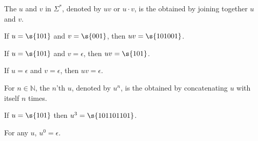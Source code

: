 \begin{flex}
\begin{definition} \label{definition:Concatenation-of-strings}
The  $u$ and $v$ in $\Sigma^*$, denoted by $uv$ or $u \cdot v$, is the  obtained by joining together $u$ and $v$. 
\end{definition}

\begin{example} \label{example:Concatenation-of-101-and-001}
If $u = \s{101}$ and $v = \s{001}$, then $uv = \s{101001}$.
\end{example}

\begin{example} \label{example:Concatenation-of-101-and-epsilon}
If $u = \s{101}$ and $v = \epsilon$, then $uv = \s{101}$.
\end{example}

\begin{example} \label{example:Concatenation-of-epsilon-and-epsilon}
If $u = \epsilon$ and $v = \epsilon$, then $uv = \epsilon$.
\end{example}
\end{flex}


\begin{flex}
\begin{definition} \label{definition:Powers-of-a-string}
For $n \in \mathbb{N}$, the $n$'th  $u$, denoted by $u^n$, is the  obtained by concatenating $u$ with itself $n$ times.
\end{definition}

\begin{example} \label{example:Third-power-of-101}
If $u = \s{101}$ then $u^3 = \s{101101101}$.
\end{example}

\begin{example} \label{example:Zeroth-power-of-a-string}
For any  $u$, $u^0 = \epsilon$.
\end{example}
\end{flex}


